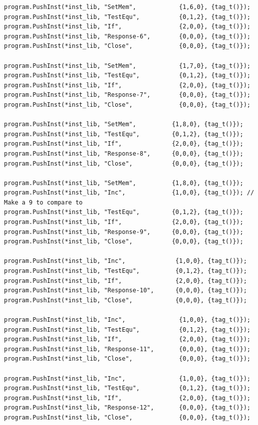 \documentclass[
]{book}
\begin{document}
\begin{verbatim}
program.PushInst(*inst_lib, "SetMem",            {1,6,0}, {tag_t()});
program.PushInst(*inst_lib, "TestEqu",           {0,1,2}, {tag_t()});
program.PushInst(*inst_lib, "If",                {2,0,0}, {tag_t()});
program.PushInst(*inst_lib, "Response-6",        {0,0,0}, {tag_t()});
program.PushInst(*inst_lib, "Close",             {0,0,0}, {tag_t()});

program.PushInst(*inst_lib, "SetMem",            {1,7,0}, {tag_t()});
program.PushInst(*inst_lib, "TestEqu",           {0,1,2}, {tag_t()});
program.PushInst(*inst_lib, "If",                {2,0,0}, {tag_t()});
program.PushInst(*inst_lib, "Response-7",        {0,0,0}, {tag_t()});
program.PushInst(*inst_lib, "Close",             {0,0,0}, {tag_t()});

program.PushInst(*inst_lib, "SetMem",          {1,8,0}, {tag_t()});
program.PushInst(*inst_lib, "TestEqu",         {0,1,2}, {tag_t()});
program.PushInst(*inst_lib, "If",              {2,0,0}, {tag_t()});
program.PushInst(*inst_lib, "Response-8",      {0,0,0}, {tag_t()});
program.PushInst(*inst_lib, "Close",           {0,0,0}, {tag_t()});

program.PushInst(*inst_lib, "SetMem",          {1,8,0}, {tag_t()});
program.PushInst(*inst_lib, "Inc",             {1,0,0}, {tag_t()}); // Make a 9 to compare to
program.PushInst(*inst_lib, "TestEqu",         {0,1,2}, {tag_t()});
program.PushInst(*inst_lib, "If",              {2,0,0}, {tag_t()});
program.PushInst(*inst_lib, "Response-9",      {0,0,0}, {tag_t()});
program.PushInst(*inst_lib, "Close",           {0,0,0}, {tag_t()});

program.PushInst(*inst_lib, "Inc",              {1,0,0}, {tag_t()});
program.PushInst(*inst_lib, "TestEqu",          {0,1,2}, {tag_t()});
program.PushInst(*inst_lib, "If",               {2,0,0}, {tag_t()});
program.PushInst(*inst_lib, "Response-10",      {0,0,0}, {tag_t()});
program.PushInst(*inst_lib, "Close",            {0,0,0}, {tag_t()});

program.PushInst(*inst_lib, "Inc",               {1,0,0}, {tag_t()});
program.PushInst(*inst_lib, "TestEqu",           {0,1,2}, {tag_t()});
program.PushInst(*inst_lib, "If",                {2,0,0}, {tag_t()});
program.PushInst(*inst_lib, "Response-11",       {0,0,0}, {tag_t()});
program.PushInst(*inst_lib, "Close",             {0,0,0}, {tag_t()});

program.PushInst(*inst_lib, "Inc",               {1,0,0}, {tag_t()});
program.PushInst(*inst_lib, "TestEqu",           {0,1,2}, {tag_t()});
program.PushInst(*inst_lib, "If",                {2,0,0}, {tag_t()});
program.PushInst(*inst_lib, "Response-12",       {0,0,0}, {tag_t()});
program.PushInst(*inst_lib, "Close",             {0,0,0}, {tag_t()});


\end{verbatim}
\end{document}
